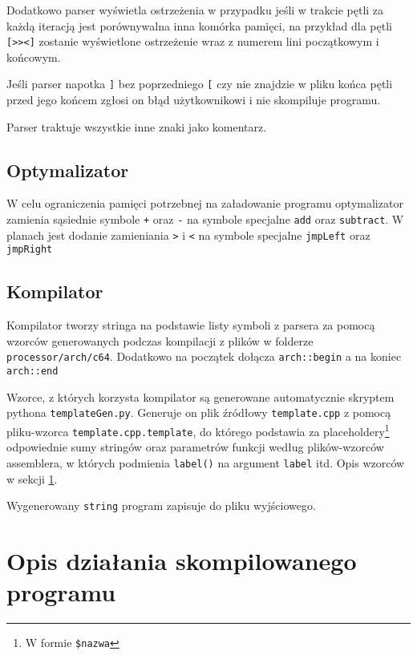 \documentclass[a4paper,12pt]{article}
\begin{document}
    Dodatkowo parser wyświetla ostrzeżenia w przypadku jeśli w trakcie pętli za każdą iteracją jest porównywalna inna komórka pamięci, na przykład dla pętli \texttt{[>><]} zostanie wyświetlone ostrzeżenie wraz z numerem lini początkowym i końcowym.

    Jeśli parser napotka \texttt{]} bez poprzedniego \texttt{[} czy nie znajdzie w pliku końca pętli przed jego końcem zgłosi on błąd użytkownikowi i nie skompiluje programu.

    Parser traktuje wszystkie inne znaki jako komentarz.
    
    \subsection*{Optymalizator}

    W celu ograniczenia pamięci potrzebnej na załadowanie programu optymalizator zamienia sąsiednie symbole \texttt{+} oraz \texttt{-} na symbole specjalne \texttt{add} oraz \texttt{subtract}. W planach jest dodanie zamieniania \texttt{>} i \texttt{<} na symbole specjalne \texttt{jmpLeft} oraz \texttt{jmpRight}

    \subsection*{Kompilator}

    Kompilator tworzy stringa na podstawie listy symboli z parsera za pomocą wzorców generowanych podczas kompilacji z plików w folderze \texttt{processor/arch/c64}. Dodatkowo na początek dołącza \texttt{arch::begin} a na koniec \texttt{arch::end}

    Wzorce, z których korzysta kompilator są generowane automatycznie skryptem pythona \texttt{templateGen.py}. Generuje on plik źródłowy \texttt{template.cpp} z pomocą pliku-wzorca \texttt{template.cpp.template}, do którego podstawia za placeholdery\footnote{W formie \texttt{\$nazwa}} odpowiednie sumy stringów oraz parametrów funkcji według plików-wzorców assemblera, w których podmienia \texttt{label()} na argument \texttt{label} itd. Opis wzorców w sekcji \ref{wzorce}.


    Wygenerowany \texttt{string} program zapisuje do pliku wyjściowego.

    \section{Opis działania skompilowanego programu}\label{wzorce}
    
\end{document}
